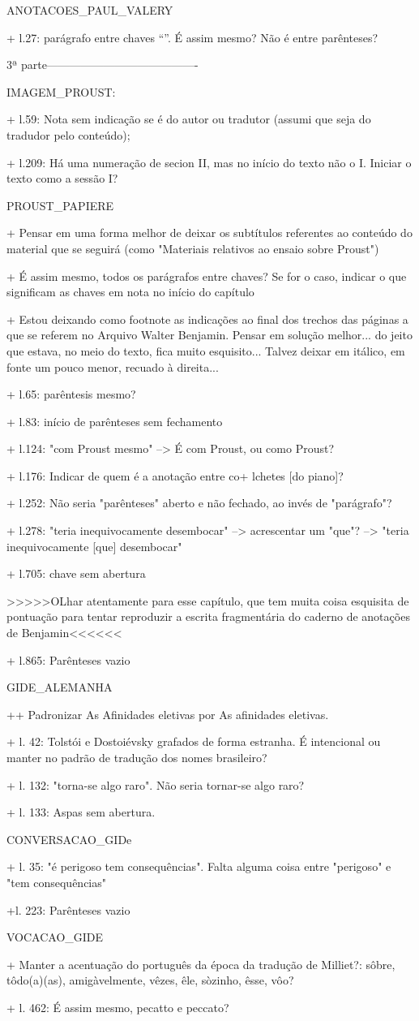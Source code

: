 ANOTACOES_PAUL_VALERY

+ l.27: parágrafo entre chaves ``{}''. É assim mesmo? Não é entre parênteses?

3ª parte----------------------------------------

IMAGEM_PROUST:

+ l.59: Nota sem indicação se é do autor ou tradutor (assumi que seja do tradudor pelo conteúdo);

+ l.209: Há uma numeração de secion II, mas no início do texto não o I. Iniciar o texto como a sessão I?

PROUST_PAPIERE

+ Pensar em uma forma melhor de deixar os subtítulos referentes ao conteúdo do material que se seguirá (como "Materiais relativos ao ensaio sobre Proust")

+ É assim mesmo, todos os parágrafos entre chaves? Se for o caso, indicar o que significam as chaves em nota no início do capítulo

+ Estou deixando como footnote as indicações ao final dos trechos das páginas a que se referem no Arquivo Walter Benjamin. Pensar em solução melhor... do jeito que estava, no meio do texto, fica muito esquisito... Talvez deixar em itálico, em fonte um pouco menor, recuado à direita...

+ l.65: parêntesis mesmo?

+ l.83: início de parênteses sem fechamento

+ l.124: "com Proust mesmo" --> É com Proust, ou como Proust?

+ l.176: Indicar de quem é a anotação entre co+ lchetes [do piano]?

+ l.252: Não seria "parênteses" aberto e não fechado, ao invés de "parágrafo"?

+ l.278: "teria inequivocamente desembocar" --> acrescentar um "que"? --> "teria inequivocamente [que] desembocar"

+ l.705: chave sem abertura

>>>>>OLhar atentamente para esse capítulo, que tem muita coisa esquisita de pontuação para tentar reproduzir a escrita fragmentária do caderno de anotações de Benjamin<<<<<<

+ l.865: Parênteses vazio

GIDE_ALEMANHA

++ Padronizar As Afinidades eletivas por As afinidades eletivas.

+ l. 42: Tolstói e Dostoiévsky grafados de forma estranha. É intencional ou manter no padrão de tradução dos nomes brasileiro?

+ l. 132: "torna-se algo raro". Não seria tornar-se algo raro?

+ l. 133: Aspas sem abertura.

CONVERSACAO_GIDe

+ l. 35: "é perigoso tem consequências". Falta alguma coisa entre "perigoso" e "tem consequências"

+l. 223: Parênteses vazio

VOCACAO_GIDE

+ Manter a acentuação do português da época da tradução de Milliet?: sôbre, tôdo(a)(as), amigàvelmente, vêzes, êle, sòzinho, êsse, vôo?

+ l. 462: É assim mesmo, pecatto e peccato?